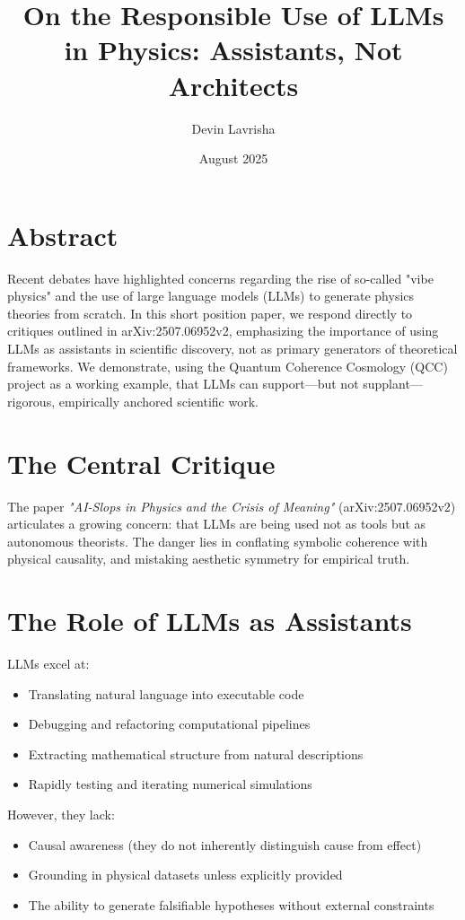 \documentclass[12pt]{article}
\title{On the Responsible Use of LLMs in Physics: Assistants, Not Architects}
\author{Devin Lavrisha}
\date{August 2025}
\begin{document}
\maketitle

\section*{Abstract}
Recent debates have highlighted concerns regarding the rise of so-called "vibe physics" and the use of large language models (LLMs) to generate physics theories from scratch. In this short position paper, we respond directly to critiques outlined in arXiv:2507.06952v2, emphasizing the importance of using LLMs as assistants in scientific discovery, not as primary generators of theoretical frameworks. We demonstrate, using the Quantum Coherence Cosmology (QCC) project as a working example, that LLMs can support—but not supplant—rigorous, empirically anchored scientific work.

\section{The Central Critique}
The paper \textit{"AI-Slops in Physics and the Crisis of Meaning"} (arXiv:2507.06952v2) articulates a growing concern: that LLMs are being used not as tools but as autonomous theorists. The danger lies in conflating symbolic coherence with physical causality, and mistaking aesthetic symmetry for empirical truth.

\section{The Role of LLMs as Assistants}
LLMs excel at:
\begin{itemize}
  \item Translating natural language into executable code
  \item Debugging and refactoring computational pipelines
  \item Extracting mathematical structure from natural descriptions
  \item Rapidly testing and iterating numerical simulations
\end{itemize}

However, they lack:
\begin{itemize}
  \item Causal awareness (they do not inherently distinguish cause from effect)
  \item Grounding in physical datasets unless explicitly provided
  \item The ability to generate falsifiable hypotheses without external constraints
\end{itemize}
\end{document}
